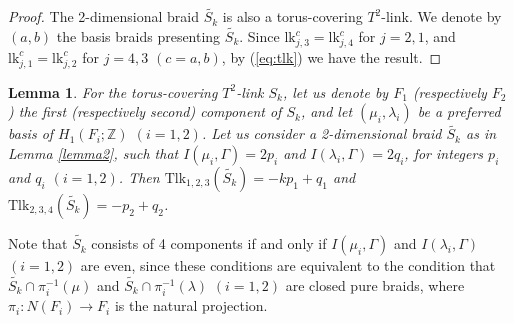 \documentclass[a4paper,11pt]{amsart}
\numberwithin{equation}{section}
\newtheorem{lemma}[theorem]{Lemma}
\begin{document}
\begin{proof}
The 2-dimensional braid $\widetilde{S_k}$ is also a torus-covering $T^2$-link. 
We denote by $(a, b)$ the basis braids presenting $\widetilde{S_k}$. 
Since $\mathrm{lk}_{j,3}^c=\mathrm{lk}_{j,4}^c$ for $j=2,1$, and 
 $\mathrm{lk}_{j,1}^c=\mathrm{lk}_{j,2}^c$ for $j=4,3$ $(c=a,b)$, by (\ref{eq:tlk}) we have the result. 
\end{proof}


\begin{lemma}\label{lemma1}
For the torus-covering $T^2$-link $S_k$, let us denote by $F_1$ (respectively $F_2$) the first (respectively second) component of $S_k$, and let $(\mu_i, \lambda_i)$ be a preferred basis of $H_1(F_i; \mathbb{Z})$ $(i=1,2)$. Let us consider a 2-dimensional braid $\widetilde{S_k}$ as in Lemma \ref{lemma2}, such that $I(\mu_i, \Gamma)=2p_i$ and  $I(\lambda_i, \Gamma)=2q_i$, for integers $p_i$ and $q_i$ $(i=1,2)$. 
Then 
$\mathrm{Tlk}_{1,2,3}(\widetilde{S_k})=-k p_1 +q_1$ and 
$\mathrm{Tlk}_{2,3,4}(\widetilde{S_k})=-p_2+q_2$. 
\end{lemma}

Note that $\widetilde{S_k}$ consists of 4 components if and only if $I(\mu_i, \Gamma)$ and $I(\lambda_i, \Gamma)$ $(i=1,2)$ are even, since these conditions are equivalent to the condition that $\widetilde{S_k}\cap \pi_i^{-1}(\mu)$ and $\widetilde{S_k} \cap \pi_i^{-1}(\lambda)$ $(i=1,2)$ are closed pure braids, where $\pi_i: N(F_i) \to F_i$ is the natural projection. 
\end{document}
